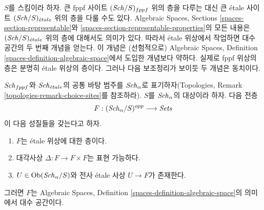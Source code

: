 \noindent
$S$를 스킴이라 하자. 큰 fppf 사이트 $(\mathit{Sch}/S)_{fppf}$ 위의 층을
다루는 대신 큰 \'etale 사이트 $(\mathit{Sch}/S)_{\acute{e}tale}$ 위의 층을 다룰
수도 있다. Algebraic Spaces, Sections
\ref{spaces-section-representable}와
\ref{spaces-section-representable-properties}의 모든 내용은
$(\mathit{Sch}/S)_{\acute{e}tale}$ 위의 층에 대해서도 의미가 있다.
따라서 \'etale 위상에서 작업하면 대수 공간의 두 번째 개념을 얻는다.
이 개념은 (선험적으로) Algebraic Spaces, Definition
\ref{spaces-definition-algebraic-space}에서 도입한 개념보다 약하다.
실제로 fppf 위상의 층은 분명히 \'etale 위상의 층이다.
그러나 다음 보조정리가 보이듯 두 개념은 동치이다.

\begin{lemma}
\label{lemma-spaces-etale}
$\mathit{Sch}_{fppf}$와 $\mathit{Sch}_{\acute{e}tale}$의 공통 바탕 범주를
$\mathit{Sch}_\alpha$로 표기하자(Topologies, Remark
\ref{topologies-remark-choice-sites}를 참조하라).
$S$를 $\mathit{Sch}_\alpha$의 대상이라 하자. 다음 전층
$$
F : (\mathit{Sch}_\alpha/S)^{opp} \longrightarrow \textit{Sets}
$$
이 다음 성질들을 갖는다고 하자.
\begin{enumerate}
\item $F$는 \'etale 위상에 대한 층이다.
\item 대각사상 $\Delta : F \to F \times F$는 표현 가능하다.
\item $U \in \mathop{\mathrm{Ob}}\nolimits(\mathit{Sch}_\alpha/S)$와 전사 \'etale 사상
$U \to F$가 존재한다.
\end{enumerate}
그러면 $F$는 Algebraic Spaces, Definition
\ref{spaces-definition-algebraic-space}의 의미에서 대수 공간이다.
\end{lemma}


